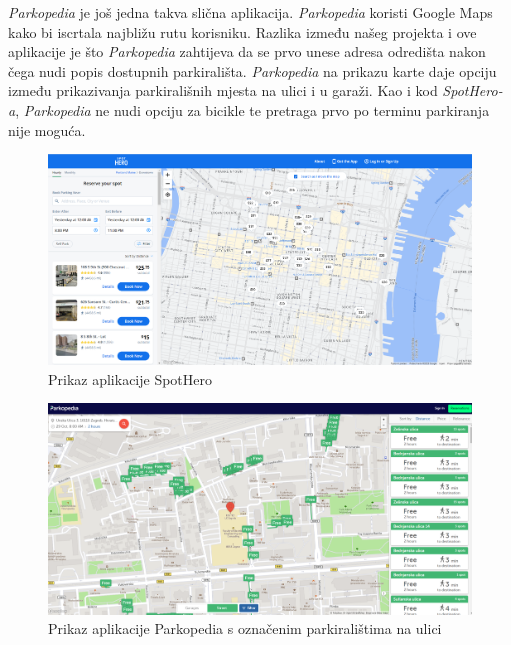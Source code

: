 		 \textit {Parkopedia} je još jedna takva slična aplikacija. \textit {Parkopedia} koristi Google Maps kako bi iscrtala najbližu rutu korisniku. Razlika između našeg projekta i ove aplikacije je što \textit {Parkopedia} zahtijeva da se prvo unese adresa odredišta nakon čega nudi popis dostupnih parkirališta. \textit {Parkopedia} na prikazu karte daje opciju između prikazivanja parkirališnih mjesta na ulici i u garaži. Kao i kod \textit {SpotHero-a}, \textit {Parkopedia} ne nudi opciju za bicikle te pretraga prvo po terminu parkiranja nije moguća.
		
		\begin{figure}[H]
			\includegraphics[width=\textwidth]{slike/spothero.PNG} 
			\caption{Prikaz aplikacije SpotHero}
			\label{fig:promjene3} 
		\end{figure}
		
		\begin{figure}[H]
			\includegraphics[width=\textwidth]{slike/parkopedia_street.PNG} 
			\caption{Prikaz aplikacije Parkopedia s označenim parkiralištima na ulici}
			\label{fig:promjene4} 
		\end{figure}
		

